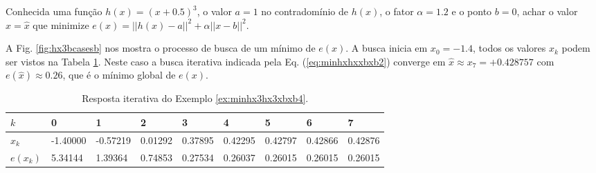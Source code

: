 \begin{example}\label{ex:minhx3hx3xbxb4}
Conhecida uma função $h(x)=(x+0.5)^3$, o valor $a=1$ no contradomínio de $h(x)$,
o fator $\alpha=1.2$ e o ponto $b=0$,
achar o valor $x=\hat{x}$ que minimize $e(x)=||h(x)-a||^2+\alpha||x-b||^2$.
\end{example}
\begin{SolutionT}\label{sol:minhx3hx3xbxb4}
 A Fig. \ref{fig:hx3bcasesb} nos mostra o processo de busca de um mínimo
 de $e(x)$. A busca inicia em $x_0=-1.4$,
 todos os valores $x_{k}$ podem ser vistos na Tabela \ref{tab:hx3bcases4}. 
Neste caso a busca iterativa indicada pela Eq. (\ref{eq:minhxhxxbxb2}) converge 
em $\hat{x}\approx x_7=+0.428757$ com $e(\hat{x})\approx 0.26$,
que é o mínimo global de $e(x)$.

\end{SolutionT}


\begin{table}[!h]
\centering
\begin{tabular}{|l|l|l|l|l|l|l|l|l|}
\hline
$k$      & 0 & 1 & 2 & 3 & 4 & 5 & 6 & 7 \\ \hline
$x_k$    & -1.40000 & -0.57219  & 0.01292  & 0.37895  & 0.42295  & 0.42797  & 0.42866  & 0.42876 \\ \hline
$e(x_k)$ &  5.34144 &  1.39364  & 0.74853  & 0.27534  & 0.26037  & 0.26015  & 0.26015  & 0.26015 \\ \hline
\end{tabular}
\caption{Resposta iterativa do Exemplo \ref{ex:minhx3hx3xbxb4}.}
\label{tab:hx3bcases4}
\end{table}


